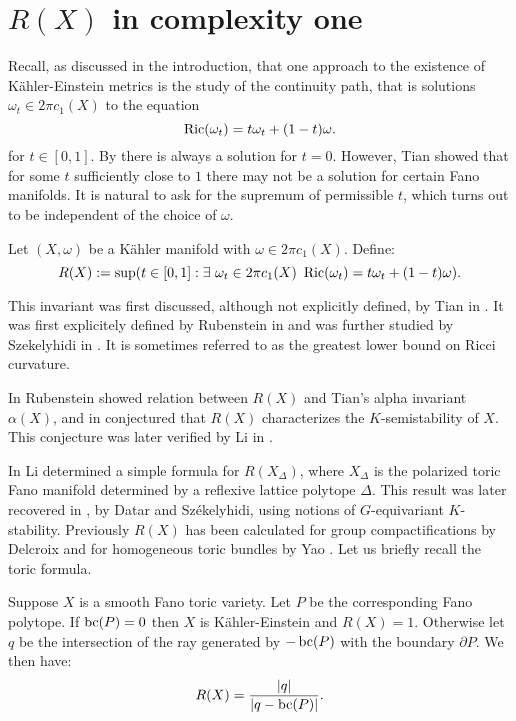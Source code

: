 \chapter{$R(X)$ in complexity one} \label{chap:R(X)}
Recall, as discussed in the introduction, that one approach to the existence of K\"ahler-Einstein metrics is the study of the continuity path, that is solutions \(\omega_t \in 2 \pi c_1(X) \) to the equation
\[
\mathop{\rm Ric}\nolimits(\omega_t) = t\omega_t + (1-t) \omega.
\]
for \(t \in [0,1]\). By \cite{Yau1977} there is always a solution for \(t = 0\). However, Tian \cite{tian1992stability} showed that for some \(t\) sufficiently close to \(1\) there may not be a solution for certain Fano manifolds. It is natural to ask for the supremum of permissible \(t\), which turns out to be independent of the choice of \(\omega\).
\begin{definition}
Let \((X,\omega)\) be a K\"ahler manifold with \(\omega \in 2 \pi c_1(X)\). Define:
\[
R(X) := \sup ( t \in [0,1]   : \exists \ \omega_t \in 2 \pi c_1(X)  \ \mathop{\rm Ric}\nolimits( \omega_t) = t \omega_t + (1-t) \omega ).
\]
\end{definition}
This invariant was first discussed, although not explicitly defined, by Tian in \cite{Tian87}. It was first explicitely defined by Rubenstein in \cite{rubinstein2008} and was further studied by Szekelyhidi in \cite{szekelyhidi2011}. It is sometimes referred to as the greatest lower bound on Ricci curvature.

In \cite{rubinstein2008} Rubenstein showed relation between \(R(X)\) and Tian's alpha invariant \(\alpha(X)\), and in \cite{rubinstein2009} conjectured that \(R(X)\) characterizes the \(K\)-semistability of \(X\). This conjecture was later verified by Li in \cite{li2017}.

In \cite{li2011} Li  determined a simple formula for \(R(X_\Delta)\), where \(X_\Delta\) is the polarized toric Fano manifold determined by a reflexive lattice polytope \(\Delta\). This result was later recovered in \cite{datar2016kahler}, by Datar and Sz\'ekelyhidi, using notions of \(G\)-equivariant \(K\)-stability. Previously \(R(X)\) has been calculated for group compactifications by Delcroix \cite{delcroix2017} and for homogeneous toric bundles by Yao \cite{yao2017}. Let us briefly recall the toric formula.
\begin{theorem}[Li]
Suppose \(X\) is a smooth Fano toric variety. Let \(P\) be the corresponding Fano polytope. If \(\mathop{\rm bc}\nolimits(P) = 0\) then \(X\) is K\"ahler-Einstein and \(R(X) = 1\). Otherwise let \(q\) be the intersection of the ray generated by \(-\mathop{\rm bc}\nolimits(P)\) with the boundary \(\partial P\). We then have:
\[
R(X) = \frac{|q|}{|q-\mathop{\rm bc}\nolimits(P)|}.
\]
\end{theorem}

